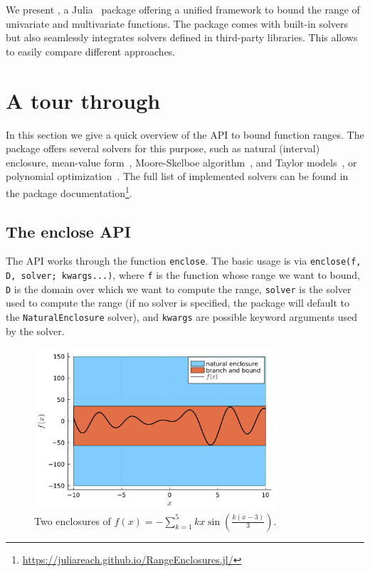 \documentclass{juliacon}
\begin{document}
\smallskip

We present , a Julia~\cite{BezansonEKS17} package offering a unified framework to bound the range of univariate and multivariate functions. The package comes with built-in solvers but also seamlessly integrates solvers defined in third-party libraries. This allows to easily compare different approaches.



\section{A tour through \RE}

In this section we give a quick overview of the API to bound function ranges. The package offers several solvers for this purpose, such as natural (interval) enclosure, mean-value form~\cite{moore2009introduction}, Moore-Skelboe algorithm~\cite{hansen2003global}, and Taylor models~\cite{benet2019taylormodels}, or polynomial optimization~\cite{legat2017sos}. The full list of implemented solvers can be found in the package documentation\footnote{\url{https://juliareach.github.io/RangeEnclosures.jl/}}.


\subsection{The enclose API}

The \emph{\RE} API works through the function \texttt{enclose}.
The basic usage is via \texttt{enclose(f, D, solver; kwargs...)}, where \texttt{f} is the function whose range we want to bound, \texttt{D} is the domain over which we want to compute the range, \texttt{solver} is the solver used to compute the range (if no solver is specified, the package will default to the \texttt{NaturalEnclosure} solver), and \texttt{kwargs} are possible keyword arguments used by the solver.

\begin{figure}[tb]
    \centering
    \includegraphics[width=\linewidth,height=6cm,keepaspectratio]{pic/enclosure_2D}
    \caption{Two enclosures of $f(x) = -\sum_{k=1}^5kx\sin(\frac{k(x-3)}{3})$.}
    \label{fig:enclosure_2D}
\end{figure}
\end{document}
